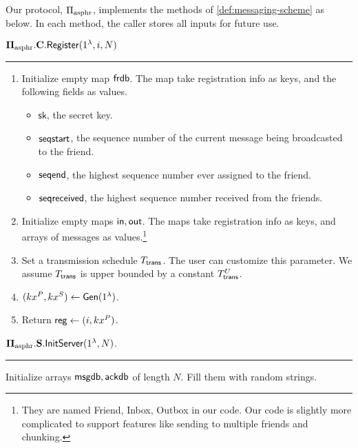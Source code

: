 \begin{definition}
Our protocol, $\Pi_{\text{asphr}}$, implements the methods of \cref{def:messaging-scheme} as below. In each method, the caller stores all inputs for future use.
\vspace{10pt}

$\mathbf{\Pi_{\text{asphr}}.C.\mathsf{Register}}(1^{\lambda}, i, N)$
\vspace{5pt}
\hrule
\vspace{5pt}
\begin{enumerate}
    \item Initialize empty map $\mathsf{frdb}$. The map take registration info as keys, and the following fields as values.
    \begin{itemize}
        \item $\mathsf{sk}$, the secret key.
        \item $\mathsf{seqstart}$, the sequence number of the current message being broadcasted to the friend.
        \item $\mathsf{seqend}$, the highest sequence number ever assigned to the friend.
        \item $\mathsf{seqreceived}$, the highest sequence number received from the friends.
    \end{itemize}
    \item Initialize empty maps $\mathsf{in}, \mathsf{out}$. The maps take registration info as keys, and arrays of messages as values.\footnote{They are named Friend, Inbox, Outbox in our code. Our code is slightly more complicated to support features like sending to multiple friends and chunking.}
    \item Set a transmission schedule $T_{\mathsf{trans}}$. The user can customize this parameter. We assume $T_{\mathsf{trans}}$ is upper bounded by a constant $T_{\mathsf{trans}}^U$.
    \item $(kx^P, kx^S) \leftarrow \mathsf{Gen}(1^{\lambda})$. 
    \item Return $\mathsf{reg} \leftarrow (i, kx^P)$.
\end{enumerate}
\vspace{10pt}
$\mathbf{\Pi_{\text{asphr}}.S.\mathsf{InitServer}}(1^{\lambda}, N)$.
\vspace{5pt}
\hrule
\vspace{5pt}
Initialize arrays $\mathsf{msgdb}, \mathsf{ackdb}$ of length $N$. Fill them with random strings.


\end{definition}
